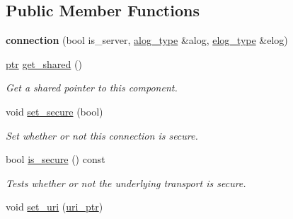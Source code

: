 \subsection*{Public Member Functions}
\begin{DoxyCompactItemize}
\item 
\mbox{\label{classwebsocketpp_1_1transport_1_1debug_1_1connection_aebfb59b75e4beecf743f9f6f6cc599ff}} 
{\bfseries connection} (bool is\+\_\+server, \mbox{\hyperlink{classwebsocketpp_1_1transport_1_1debug_1_1connection_a4041875e69d6a33ed4f27055fd9d6409}{alog\+\_\+type}} \&alog, \mbox{\hyperlink{classwebsocketpp_1_1transport_1_1debug_1_1connection_a38501811c59ca185f0dde7fa7fa8486f}{elog\+\_\+type}} \&elog)
\item 
\mbox{\label{classwebsocketpp_1_1transport_1_1debug_1_1connection_a100e8592dd57f19971d933b2b47ef820}} 
\mbox{\hyperlink{classwebsocketpp_1_1transport_1_1debug_1_1connection_a40631f93557c3308c2c8c7897e6a4825}{ptr}} \mbox{\hyperlink{classwebsocketpp_1_1transport_1_1debug_1_1connection_a100e8592dd57f19971d933b2b47ef820}{get\+\_\+shared}} ()
\begin{DoxyCompactList}\small\item\em Get a shared pointer to this component. \end{DoxyCompactList}\item 
void \mbox{\hyperlink{classwebsocketpp_1_1transport_1_1debug_1_1connection_a70244283cf80113e73f6dda8c1a2c4be}{set\+\_\+secure}} (bool)
\begin{DoxyCompactList}\small\item\em Set whether or not this connection is secure. \end{DoxyCompactList}\item 
bool \mbox{\hyperlink{classwebsocketpp_1_1transport_1_1debug_1_1connection_a49c3bba737ddb4a2ef6bf0c3b40fd130}{is\+\_\+secure}} () const
\begin{DoxyCompactList}\small\item\em Tests whether or not the underlying transport is secure. \end{DoxyCompactList}\item 
void \mbox{\hyperlink{classwebsocketpp_1_1transport_1_1debug_1_1connection_a30a06b3bfd0bd2b61822724c99911f1c}{set\+\_\+uri}} (\mbox{\hyperlink{namespacewebsocketpp_aae370ea5ac83a8ece7712cb39fc23f5b}{uri\+\_\+ptr}})

\end{DoxyCompactItemize}
